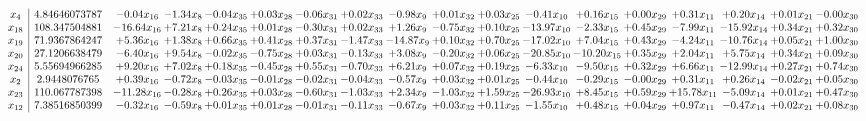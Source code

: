 \documentclass[9pt]{article}
\begin{document}
 \[\begin{array}{c| c c@{\hskip 2pt} c@{\hskip 2pt} c@{\hskip 2pt} c@{\hskip 2pt} c@{\hskip 2pt} c@{\hskip 2pt} c@{\hskip 2pt} c@{\hskip 2pt} c@{\hskip 2pt} c@{\hskip 2pt} c@{\hskip 2pt} c@{\hskip 2pt} c@{\hskip 2pt} c@{\hskip 2pt} c@{\hskip 2pt} c@{\hskip 2pt} }
 x_{4}   &  4.84646073787 & -0.04 x_{16} & -1.34 x_{8} & -0.04 x_{35} & +  0.03 x_{28} & -0.06 x_{31} & +  0.02 x_{33} & -0.98 x_{9} & +  0.01 x_{32} & +  0.03 x_{25} & -0.41 x_{10} & +  0.16 x_{15} & +  0.00 x_{29} & +  0.31 x_{11} & +  0.20 x_{14} & +  0.01 x_{21} & -0.00 x_{30}\\
 x_{18}   &  108.347504881 & -16.64 x_{16} & +  7.21 x_{8} & +  0.24 x_{35} & +  0.01 x_{28} & -0.30 x_{31} & +  0.02 x_{33} & +  1.26 x_{9} & -0.75 x_{32} & +  0.10 x_{25} & -13.97 x_{10} & -2.33 x_{15} & +  0.45 x_{29} & -7.99 x_{11} & -15.92 x_{14} & +  0.34 x_{21} & +  0.32 x_{30}\\
 x_{19}   &  71.9367864247 & +  5.36 x_{16} & +  1.38 x_{8} & +  0.66 x_{35} & +  0.41 x_{28} & +  0.37 x_{31} & -1.47 x_{33} & -14.87 x_{9} & +  0.10 x_{32} & +  0.70 x_{25} & -17.02 x_{10} & +  7.04 x_{15} & +  0.43 x_{29} & -4.24 x_{11} & -10.76 x_{14} & +  0.05 x_{21} & +  1.00 x_{30}\\
 x_{20}   &  27.1206638479 & -6.40 x_{16} & +  9.54 x_{8} & -0.02 x_{35} & -0.75 x_{28} & +  0.03 x_{31} & -0.13 x_{33} & +  3.08 x_{9} & -0.20 x_{32} & +  0.06 x_{25} & -20.85 x_{10} & -10.20 x_{15} & +  0.35 x_{29} & +  2.04 x_{11} & +  5.75 x_{14} & +  0.34 x_{21} & +  0.09 x_{30}\\
 x_{24}   &  5.55694966285 & +  9.20 x_{16} & +  7.02 x_{8} & +  0.18 x_{35} & -0.45 x_{28} & +  0.55 x_{31} & -0.70 x_{33} & +  6.21 x_{9} & +  0.07 x_{32} & +  0.19 x_{25} & -6.33 x_{10} & -9.50 x_{15} & +  0.32 x_{29} & +  6.66 x_{11} & -12.99 x_{14} & +  0.27 x_{21} & +  0.74 x_{30}\\
 x_{2}   &  2.9448076765 & +  0.39 x_{16} & -0.72 x_{8} & -0.03 x_{35} & -0.01 x_{28} & -0.02 x_{31} & -0.04 x_{33} & -0.57 x_{9} & +  0.03 x_{32} & +  0.01 x_{25} & -0.44 x_{10} & -0.29 x_{15} & -0.00 x_{29} & +  0.31 x_{11} & +  0.26 x_{14} & -0.02 x_{21} & +  0.05 x_{30}\\
 x_{23}   &  110.067787398 & -11.28 x_{16} & -0.28 x_{8} & +  0.26 x_{35} & +  0.03 x_{28} & -0.60 x_{31} & -1.03 x_{33} & +  2.34 x_{9} & -1.03 x_{32} & +  1.59 x_{25} & -26.93 x_{10} & +  8.45 x_{15} & +  0.59 x_{29} & + 15.78 x_{11} & -5.09 x_{14} & +  0.01 x_{21} & +  0.47 x_{30}\\
 x_{12}   &  7.38516850399 & -0.32 x_{16} & -0.59 x_{8} & +  0.01 x_{35} & +  0.01 x_{28} & -0.01 x_{31} & -0.11 x_{33} & -0.67 x_{9} & +  0.03 x_{32} & +  0.11 x_{25} & -1.55 x_{10} & +  0.48 x_{15} & +  0.04 x_{29} & +  0.97 x_{11} & -0.47 x_{14} & +  0.02 x_{21} & +  0.08 x_{30}\\

\end{array}\]
\end{document}
